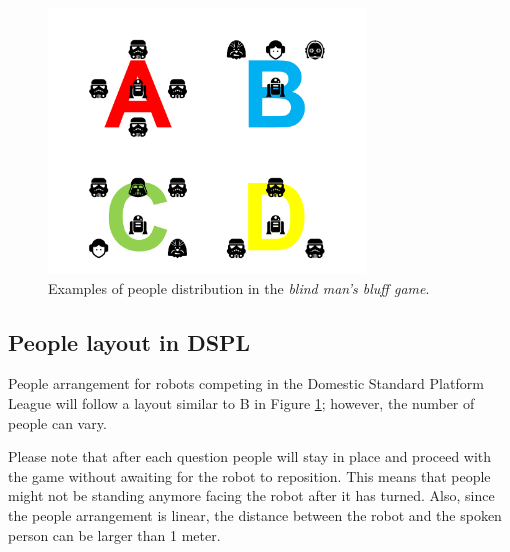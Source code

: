 \begin{figure}[H]
    \begin{center}
        \includegraphics[width=0.75\textwidth]{images/spr_ppl_layout.png}
        \vspace{-10pt}
        \caption{Examples of people distribution in the \textit{blind man's bluff game}.}
        \label{fig:spr-ppl-layout}
    \end{center}
\end{figure}


\subsection{People layout in DSPL}
People arrangement for robots competing in the Domestic Standard Platform League will follow a layout similar to B in Figure \ref{fig:spr-ppl-layout}; however, the number of people can vary.

Please note that after each question people will stay in place and proceed with the game without awaiting for the robot to reposition. This means that people might not be standing anymore facing the robot after it has turned. Also, since the people arrangement is linear, the distance between the robot and the spoken person can be larger than 1 meter.

